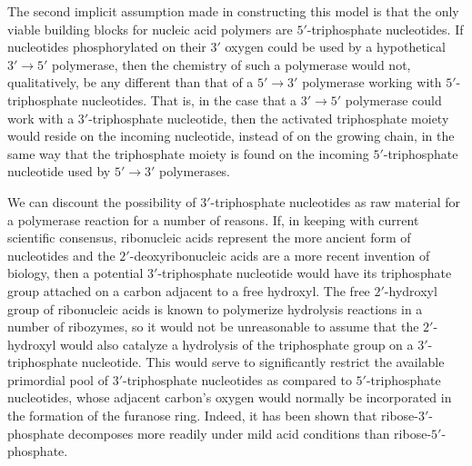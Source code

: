 The second implicit assumption made in constructing this model is that the only viable building blocks for nucleic acid polymers are $5'$-triphosphate nucleotides. If nucleotides phosphorylated on their $3'$ oxygen could be used by a hypothetical $3'\to5'$ polymerase, then the chemistry of such a polymerase would not, qualitatively, be any different than that of a $5'\to3'$ polymerase working with $5'$-triphosphate nucleotides. That is, in the case that a $3'\to5'$ polymerase could work with a $3'$-triphosphate nucleotide, then the activated triphosphate moiety would reside on the incoming nucleotide, instead of on the growing chain, in the same way that the triphosphate moiety is found on the incoming $5'$-triphosphate nucleotide used by $5'\to3'$ polymerases.

We can discount the possibility of $3'$-triphosphate nucleotides as raw material for a polymerase reaction for a number of reasons. If, in keeping with current scientific consensus, ribonucleic acids represent the more ancient form of nucleotides and the $2'$-deoxyribonucleic acids are a more recent invention of biology, then a potential $3'$-triphosphate nucleotide would have its triphosphate group attached on a carbon adjacent to a free hydroxyl. The free $2'$-hydroxyl group of ribonucleic acids is known to polymerize hydrolysis reactions in a number of ribozymes, so it would not be unreasonable to assume that the $2'$-hydroxyl would also catalyze a hydrolysis of the triphosphate group on a $3'$-triphosphate nucleotide. This would serve to significantly restrict the available primordial pool of $3'$-triphosphate nucleotides as compared to $5'$-triphosphate nucleotides, whose adjacent carbon's oxygen would normally be incorporated in the formation of the furanose ring. Indeed, it has been shown that ribose-$3'$-phosphate decomposes more readily under mild acid conditions than ribose-$5'$-phosphate.

